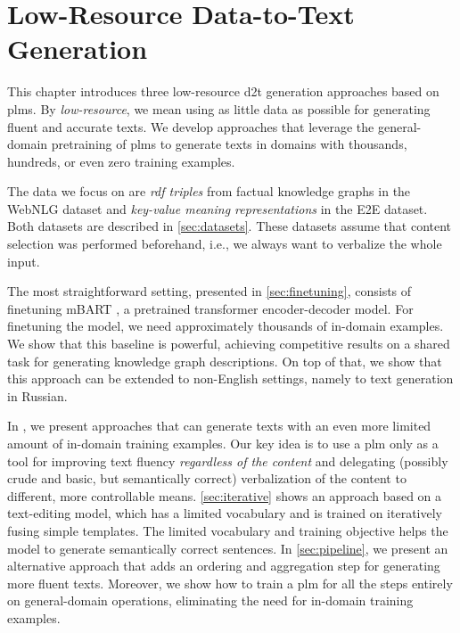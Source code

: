 \chapter{Low-Resource Data-to-Text Generation}
\label{chap:low-res}

This chapter introduces three low-resource \ac{d2t} generation approaches based on \acp{plm}. By \emph{low-resource}, we mean using as little data as possible for generating fluent and accurate texts. We develop approaches that leverage the general-domain pretraining of \acp{plm} to generate texts in domains with thousands, hundreds, or even zero training examples.

The data we focus on are \emph{\acs{rdf} triples} from factual knowledge graphs in the WebNLG dataset and \emph{key-value meaning representations} in the E2E dataset. Both datasets are described in \autoref{sec:datasets}. These datasets assume that content selection was performed beforehand, i.e., we always want to verbalize the whole input.

The most straightforward setting, presented in \autoref{sec:finetuning}, consists of finetuning mBART \cite{liuMultilingualDenoisingPretraining2020}, a pretrained transformer encoder-decoder model. For finetuning the model, we need approximately thousands of in-domain examples. We show that this baseline is powerful, achieving competitive results on a shared task for generating knowledge graph descriptions. On top of that, we show that this approach can be extended to non-English settings, namely to text generation in Russian.

In , we present approaches that can generate texts with an even more limited amount of in-domain training examples. Our key idea is to use a \ac{plm} only as a tool for improving text fluency \emph{regardless of the content} and delegating (possibly crude and basic, but semantically correct) verbalization of the content to different, more controllable means. \autoref{sec:iterative} shows an approach based on a text-editing model, which has a limited vocabulary and is trained on iteratively fusing simple templates. The limited vocabulary and training objective helps the model to generate semantically correct sentences. In \autoref{sec:pipeline}, we present an alternative approach that adds an ordering and aggregation step for generating more fluent texts. Moreover, we show how to train a \ac{plm} for all the steps entirely on general-domain operations, eliminating the need for in-domain training examples.


